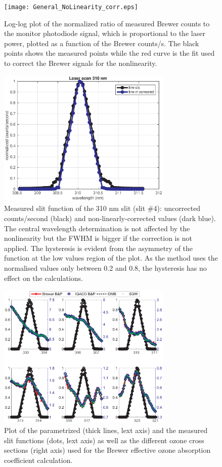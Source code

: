 \documentclass[acp]{copernicus} %
\begin{document}
\clearpage
\begin{figure}[t]
\texttt{[image: General\_NoLinearity\_corr.eps]}
\caption{ Log-log plot of the normalized ratio of measured Brewer counts to the monitor photodiode signal, which is proportional to the laser power, plotted as a function of the Brewer counts/s. The black points shows the measured points while the red curve is the fit used to correct the Brewer signals for the nonlinearity.}
\label{fig:no}
\end{figure}
\clearpage
\begin{figure}[t]
\includegraphics[width=8.3cm]{figures/General_Corrected_vs_uncorrected.eps}
\caption{Measured slit function of the 310 nm slit (slit \#4): uncorrected counts/second (black) and non-linearly-corrected values (dark blue). The central wavelength determination is not affected by the nonlinearity but the FWHM is bigger if the correction is not applied. The hysteresis is evident from the asymmetry of the function at the low values region of the plot. As the method uses the normalised values only between 0.2 and 0.8, the hysteresis has no effect on the calculations.}
\label{fig:slitcor}
\end{figure}

%

\clearpage
%
\begin{figure}[t]
\includegraphics[width=8.3cm]{figures/General_Laser_Brewer_ozone_mode.eps}
\caption{ Plot of the parametrized (thick lines, lext axis) and the measured slit functions (dots, lext axis) as well as the different ozone cross sections (right axis) used for the Brewer effective ozone absorption coefficient calculation.}
\label{fig:param}
\end{figure}
\end{document}
